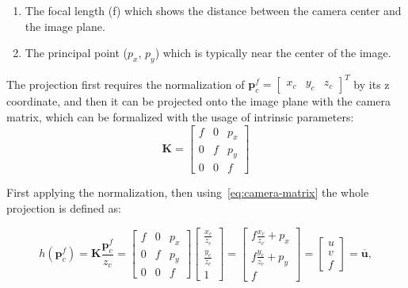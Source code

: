 \begin{enumerate}
    \item The focal length (f) which shows the distance between the camera center and the image plane.
    \item The principal point ($p_x$, $p_y$) which is typically near the center of the image.
\end{enumerate}

The projection first requires the normalization of $\mathbf{p}_c^f=\begin{bmatrix} x_c & y_c & z_c\end{bmatrix}^T$ by its z coordinate, and then it can be projected onto the image plane with the camera matrix, which can be formalized with the usage of intrinsic parameters:
\begin{equation}
    \mathbf{K}=\begin{bmatrix}
        f & 0 & p_x \\
        0 & f & p_y \\
        0 & 0 & f 
    \end{bmatrix}
    \label{eq:camera-matrix}
\end{equation}

First applying the normalization, then using~\eqref{eq:camera-matrix} the whole projection is defined as:

\begin{equation}
    h(\mathbf{p}_c^f)=\mathbf{K}\frac{\mathbf{p}_c^f}{z_c}=\begin{bmatrix}
        f & 0 & p_x \\
        0 & f & p_y \\
        0 & 0 & f
    \end{bmatrix}\begin{bmatrix}
        \frac{x_c}{z_c} \\ \frac{y_c}{z_c} \\ 1 
    \end{bmatrix}=\begin{bmatrix}
        f\frac{x_c}{z_c}+p_x \\
        f\frac{y_c}{z_c}+p_y \\
        f
    \end{bmatrix}=\begin{bmatrix}
        u \\ v \\ f
    \end{bmatrix}=\overline{\mathbf{u}},
    \label{eq:pinhole-projection}
\end{equation}

